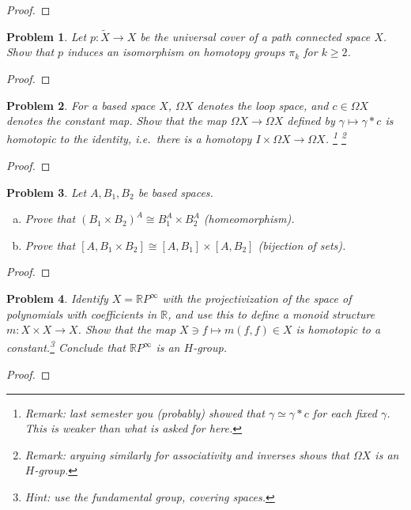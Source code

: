 \documentclass[11pt]{article}
\newtheorem{problem}{Problem}
\begin{document}
\begin{proof}

\end{proof}

\pagebreak 


\begin{problem}
Let $p:\tilde X\to X$ be the universal cover of a path connected space $X$. Show that $p$ induces an isomorphism on homotopy groups $\pi_k$ for $k\ge2$. 
\end{problem}

\begin{proof}

\end{proof} 


\pagebreak 
\begin{problem}For a based space $X$, $\Omega X$ denotes the loop space, and $c\in\Omega X$ denotes the constant map. Show that the map $\Omega X\rightarrow\Omega X$ defined by $\gamma\mapsto \gamma*c$ is homotopic to the identity, i.e.\ there is a homotopy $I\times \Omega X\to \Omega X$. \footnote{Remark: last semester you (probably) showed that $\gamma\simeq \gamma*c$ for each fixed $\gamma$. This is weaker than what is asked for here.}  \footnote{Remark: arguing similarly for associativity and inverses shows that $\Omega X$ is an $H$-group.} 
\end{problem}

\begin{proof}

\end{proof}

\pagebreak 
\begin{problem}
Let $A,B_1,B_2$ be based spaces. 
\begin{enumerate}[(a)]
\item Prove that $(B_1\times B_2)^A\cong B_1^A\times B_2^A$ (homeomorphism). 
\item Prove that $[A,B_1\times B_2]\cong[A,B_1]\times[A,B_2]$ (bijection of sets). 
\end{enumerate} 
\end{problem}

\begin{proof}

\end{proof}



\pagebreak 
\begin{problem}
Identify $X=\mathbb R P^\infty$ with the projectivization of the space of polynomials with coefficients in $\mathbb R$, and use this to define a monoid structure $m:X\times X\to X$. Show that the map $X\ni f\mapsto m(f,f)\in X$ is homotopic to a constant.\footnote{Hint: use the fundamental group, covering spaces.} Conclude that $\mathbb R P^\infty$ is an $H$-group. 
\end{problem}

\begin{proof}

\end{proof}
\end{document}
